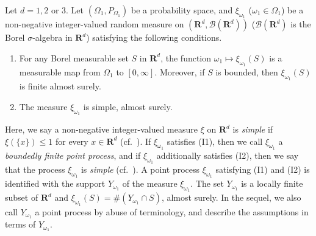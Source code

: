 \documentclass[12pt,a4paper]{article}
\begin{document}
Let $d=1,2$ or $3$.
Let $(\Omega_1,P_{\Omega_1})$ be a probability space,
and $\xi_{\omega_1}$ ($\omega_1\in \Omega_1$) be a 
non-negative integer-valued random measure on 
$(\mathbf{R}^d,\mathcal{B}(\mathbf{R}^d))$ 
($\mathcal{B}(\mathbf{R}^d)$ is the Borel $\sigma$-algebra in $\mathbf{R}^d$)
satisfying the following conditions.
\begin{enumerate}

 \item[(I1)]
For any Borel measurable set $S$ in $\mathbf{R}^d$,
the function $\omega_1\mapsto \xi_{\omega_1}(S)$ is a measurable 
map from $\Omega_1$ to $[0,\infty]$.
Moreover, if $S$ is bounded, then
$\xi_{\omega_1}(S)$ is finite almost surely.


 \item[(I2)]
The measure $\xi_{\omega_1}$ is simple, almost surely.
\end{enumerate}
Here, we say a non-negative integer-valued measure $\xi$ on $\mathbf{R}^d$ is 
\textit{simple} if $\xi(\{x\})\leq 1$ for every $x\in \mathbf{R}^d$
(cf.\ \cite{La-Pe}).
If $\xi_{\omega_1}$ satisfies (I1),
then we call $\xi_{\omega_1}$ a \textit{boundedly finite point process},
and if $\xi_{\omega_1}$ additionally satisfies (I2),
then we say that the process $\xi_{\omega_1}$ is \textit{simple}
(cf.\ \cite{La-Pe, Da-Ve1, Kal}).
A point process $\xi_{\omega_1}$ satisfying (I1) and (I2) 
is identified with the support 
$Y_{\omega_1}$ of the measure $\xi_{\omega_1}$.
The set $Y_{\omega_1}$ is a locally finite subset of $\mathbf{R}^d$
and $\xi_{\omega_1}(S)=\#(Y_{\omega_1}\cap S)$,
almost surely.
In the sequel, 
we also call $Y_{\omega_1}$ a point process 
by abuse of terminology,
and describe the assumptions in terms of $Y_{\omega_1}$.
\end{document}
